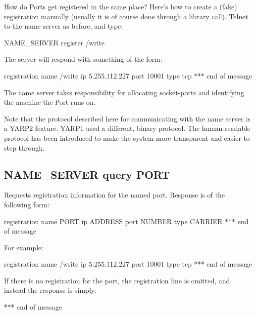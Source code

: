 \documentclass[a4]{article}
\newenvironment{codecase}[1]{\subsection{#1}}{}
\begin{document}
How do Ports get registered in the same place?  Here's how to create a
(fake) registration
manually (usually it is of course done through a library call).
Telnet to the name server as before, and type:
%
\begin{code}
NAME_SERVER register /write
\end{code}
%
The server will respond with something of the form:
%
\begin{code}
registration name /write ip 5.255.112.227 port 10001 type tcp
*** end of message
\end{code}

The name server takes responsibility for allocating
socket-ports and identifying the machine the Port runs on.

Note that the protocol described here for communicating with the name
server is a YARP2 feature.  YARP1 used a different, binary protocol.
The human-readable protocol has been introduced to make the system
more transparent and easier to step through.

\begin{codecase}{NAME\_SERVER query PORT}
Requests registration information for the named port.  Response is of 
the following form:
\begin{code}
registration name PORT ip ADDRESS port NUMBER type CARRIER
*** end of message
\end{code}
For example:
\begin{code}
registration name /write ip 5.255.112.227 port 10001 type tcp
*** end of message
\end{code}
If there is no registration for the port, the registration line
is omitted, and instead the response is simply:
\begin{code}
*** end of message
\end{code}
\end{codecase}
\end{document}
